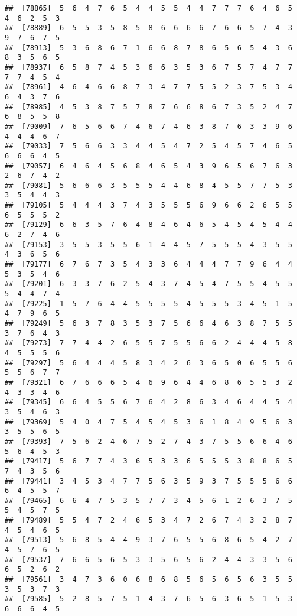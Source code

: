 \documentclass[
]{book}
\begin{document}
\begin{verbatim}
##  [78865]  5  6  4  7  6  5  4  4  5  5  4  4  7  7  7  6  4  6  5  4  6  2  5  3
##  [78889]  6  5  5  3  5  8  5  8  6  6  6  6  7  6  6  5  7  4  3  9  7  6  7  5
##  [78913]  5  3  6  8  6  7  1  6  6  8  7  8  6  5  6  5  4  3  6  8  3  5  6  5
##  [78937]  6  5  8  7  4  5  3  6  6  3  5  3  6  7  5  7  4  7  7  7  7  4  5  4
##  [78961]  4  6  4  6  6  8  7  3  4  7  7  5  5  2  3  7  5  3  4  6  4  3  7  6
##  [78985]  4  5  3  8  7  5  7  8  7  6  6  8  6  7  3  5  2  4  7  6  8  5  5  8
##  [79009]  7  6  5  6  6  7  4  6  7  4  6  3  8  7  6  3  3  9  6  4  4  4  6  7
##  [79033]  7  5  6  6  3  3  4  4  5  4  7  2  5  4  5  7  4  6  5  6  6  6  4  5
##  [79057]  6  4  6  4  5  6  8  4  6  5  4  3  9  6  5  6  7  6  3  2  6  7  4  2
##  [79081]  5  6  6  6  3  5  5  5  4  4  6  8  4  5  5  7  7  5  3  3  5  4  4  3
##  [79105]  5  4  4  4  3  7  4  3  5  5  5  6  9  6  6  2  6  5  5  6  5  5  5  2
##  [79129]  6  6  3  5  7  6  4  8  4  6  4  6  5  4  5  4  5  4  4  6  2  7  4  6
##  [79153]  3  5  5  3  5  5  6  1  4  4  5  7  5  5  5  4  3  5  5  4  3  6  5  6
##  [79177]  6  7  6  7  3  5  4  3  3  6  4  4  4  7  7  9  6  4  4  5  3  5  4  6
##  [79201]  6  3  3  7  6  2  5  4  3  7  4  5  4  7  5  5  4  5  5  5  4  4  7  4
##  [79225]  1  5  7  6  4  4  5  5  5  5  4  5  5  5  3  4  5  1  5  4  7  9  6  5
##  [79249]  5  6  3  7  8  3  5  3  7  5  6  6  4  6  3  8  7  5  5  3  7  6  4  3
##  [79273]  7  7  4  4  2  6  5  5  7  5  5  6  6  2  4  4  4  5  8  4  5  5  5  6
##  [79297]  5  6  4  4  4  5  8  3  4  2  6  3  6  5  0  6  5  5  6  5  5  6  7  7
##  [79321]  6  7  6  6  6  5  4  6  9  6  4  4  6  8  6  5  5  3  2  4  3  3  4  6
##  [79345]  6  6  4  5  5  6  7  6  4  2  8  6  3  4  6  4  4  5  4  3  5  4  6  3
##  [79369]  5  4  0  4  7  5  4  5  4  5  3  6  1  8  4  9  5  6  3  3  5  5  6  5
##  [79393]  7  5  6  2  4  6  7  5  2  7  4  3  7  5  5  6  6  4  6  5  6  4  5  3
##  [79417]  5  6  7  7  4  3  6  5  3  3  6  5  5  5  3  8  8  6  5  7  4  3  5  6
##  [79441]  3  4  5  3  4  7  7  5  6  3  5  9  3  7  5  5  5  6  6  6  4  5  5  7
##  [79465]  6  6  4  7  5  3  5  7  7  3  4  5  6  1  2  6  3  7  5  5  4  5  7  5
##  [79489]  5  5  4  7  2  4  6  5  3  4  7  2  6  7  4  3  2  8  7  4  5  4  6  5
##  [79513]  5  6  8  5  4  4  9  3  7  6  5  5  6  8  6  5  4  2  7  4  5  7  6  5
##  [79537]  7  6  6  5  6  5  3  3  5  6  5  6  2  4  4  3  3  5  6  6  5  2  6  2
##  [79561]  3  4  7  3  6  0  6  8  6  8  5  6  5  6  5  6  3  5  5  3  5  3  7  3
##  [79585]  5  2  8  5  7  5  1  4  3  7  6  5  6  3  6  5  1  5  3  6  6  6  4  5

\end{verbatim}
\end{document}
